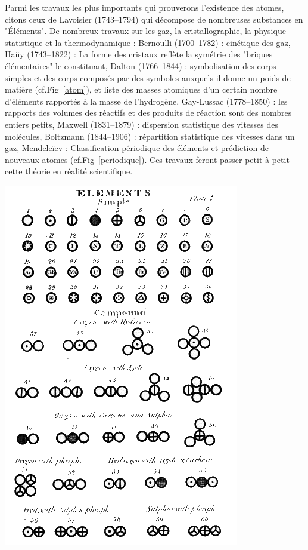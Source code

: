  Parmi les travaux les plus importants qui prouverons l'existence des atomes, citons ceux de Lavoisier (\num{1743}--\num{1794}) qui décompose de nombreuses substances en "Éléments". De nombreux travaux sur les gaz, la cristallographie, la physique statistique et la thermodynamique : Bernoulli (\num{1700}--\num{1782}) : cinétique des gaz, Haüy (\num{1743}--\num{1822}) : La forme des cristaux reflète la symétrie des "briques élémentaires" le constituant, Dalton (\num{1766}--\num{1844}) : symbolisation des corps simples et des corps composés par des symboles auxquels il donne un poids de matière (cf.Fig~\ref{atom}), et liste des masses atomiques d'un certain nombre d'éléments rapportés à la masse de l'hydrogène, Gay-Lussac (\num{1778}--\num{1850}) : les rapports des volumes des réactifs et des produits de réaction sont des nombres entiers petits, Maxwell (\num{1831}--\num{1879}) : dispersion statistique des vitesses des molécules, Boltzmann (\num{1844}--\num{1906}) : répartition statistique des vitesses dans un gaz, Mendeleïev : Classification périodique des éléments et prédiction de nouveaux atomes (cf.Fig~\ref{periodique}). Ces travaux feront passer petit à petit cette théorie en réalité scientifique. 
 
\marginpar
{
	\includegraphics[width=\marginparwidth]{SM/Dalton.png}
    \label{atom}
}

